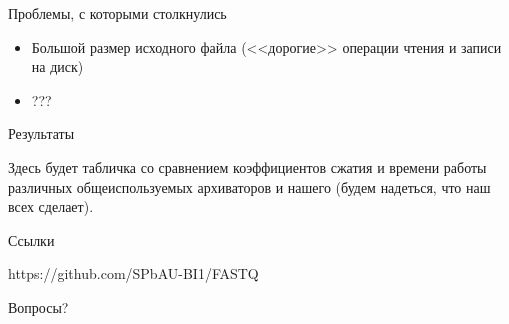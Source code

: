 \documentclass[12pt]{beamer}
\begin{document}
\begin{frame}{Проблемы, с которыми столкнулись}

    \begin{itemize}
    
        \item Большой размер исходного файла (<<дорогие>> операции чтения и записи на диск)
        
        \item ???

    \end{itemize}
    
     

\end{frame}

\begin{frame}{Результаты}
    
    Здесь будет табличка со сравнением коэффициентов сжатия и времени работы различных общеиспользуемых архиваторов и нашего (будем надеться, что наш всех сделает).

\end{frame}

\begin{frame}{Ссылки}

    https://github.com/SPbAU-BI1/FASTQ

\end{frame}

\begin{frame}{}

    Вопросы?

\end{frame}
\end{document}

